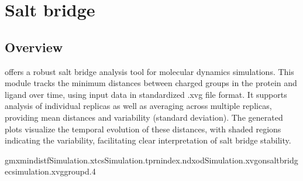 \documentclass[a4paper,10pt,english]{sphinxmanual}
\begin{document}
\begin{sphinxVerbatim}[commandchars=\\\{\}]
  
     

    

    
  
\end{sphinxVerbatim}

\sphinxstepscope


\chapter{Salt bridge}
\label{\detokenize{Saltbridge:salt-bridge}}\label{\detokenize{Saltbridge::doc}}

\section{Overview}
\label{\detokenize{Saltbridge:overview}}
\sphinxAtStartPar
{} offers a robust salt bridge analysis tool for molecular dynamics simulations. This module tracks the minimum distances between charged groups in the protein and ligand over time, using input data in standardized .xvg file format. It supports analysis of individual replicas as well as averaging across multiple replicas, providing mean distances and variability (standard deviation). The generated plots visualize the temporal evolution of these distances, with shaded regions indicating the variability, facilitating clear interpretation of salt bridge stability.

\sphinxAtStartPar
{}

\begin{sphinxVerbatim}[commandchars=\\\{\}]
gmxmindist\PYGZhy{}fSimulation.xtc\PYGZhy{}sSimulation.tpr\PYGZhy{}nindex.ndx\PYGZhy{}odSimulation.xvg\PYGZhy{}onsaltbridge\PYGZus{}csimulation.xvg\PYGZhy{}group\PYGZhy{}d.4
\end{sphinxVerbatim}
\end{document}
